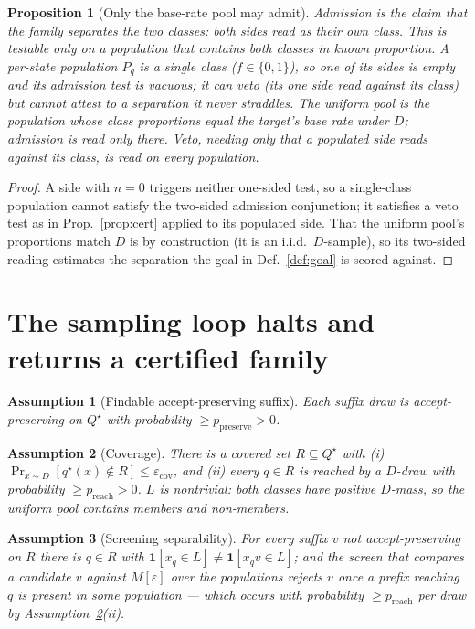 \documentclass[11pt]{article}
\newtheorem{proposition}{Proposition}
\newtheorem{assumption}{Assumption}
\begin{document}
\begin{proposition}[Only the base-rate pool may admit]\label{prop:onlyunif}
Admission is the claim that the family separates the two classes: both sides read
as their own class. This is testable only on a population that contains both
classes in known proportion. A per-state population $P_q$ is a single class
($f\in\{0,1\}$), so one of its sides is empty and its admission test is vacuous;
it can veto (its one side read against its class) but cannot attest to a
separation it never straddles. The uniform pool is the population whose class
proportions equal the target's base rate under $D$; admission is read only there.
Veto, needing only that a populated side reads against its class, is read on every
population.
\end{proposition}
\begin{proof}
A side with $n=0$ triggers neither one-sided test, so a single-class population
cannot satisfy the two-sided admission conjunction; it satisfies a veto test as in
Prop.~\ref{prop:cert} applied to its populated side. That the uniform pool's
proportions match $D$ is by construction (it is an i.i.d.\ $D$-sample), so its
two-sided reading estimates the separation the goal in Def.~\ref{def:goal} is
scored against.
\end{proof}

\section{The sampling loop halts and returns a certified family}\label{sec:halt}

\begin{assumption}[Findable accept-preserving suffix]\label{ass:preserve}
Each suffix draw is accept-preserving on $Q^\star$ with probability
$\ge p_{\mathrm{preserve}}>0$.
\end{assumption}

\begin{assumption}[Coverage]\label{ass:cover}
There is a covered set $R\subseteq Q^\star$ with (i)
$\Pr_{x\sim D}[q^\star(x)\notin R]\le\varepsilon_{\mathrm{cov}}$, and (ii) every
$q\in R$ is reached by a $D$-draw with probability $\ge p_{\mathrm{reach}}>0$. $L$
is nontrivial: both classes have positive $D$-mass, so the uniform pool contains
members and non-members.
\end{assumption}

\begin{assumption}[Screening separability]\label{ass:screen}
For every suffix $v$ not accept-preserving on $R$ there is $q\in R$ with
$\mathbf 1[x_q\in L]\ne\mathbf 1[x_q v\in L]$; and the screen that compares a
candidate $v$ against $M[\varepsilon]$ over the populations rejects $v$ once a
prefix reaching $q$ is present in some population --- which occurs with probability
$\ge p_{\mathrm{reach}}$ per draw by Assumption~\ref{ass:cover}(ii).
\end{assumption}
\end{document}
